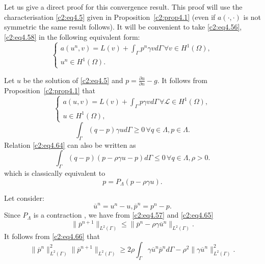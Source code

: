Let us give a direct proof for this convergence result. This proof
will use the characterisation \eqref{c2:eq4.5} given in
Proposition~\ref{c2:prop4.1}  
(even if $a(\cdot, \cdot)$ is not symmetric the same result follows). It will
be convenient to take \eqref{c2:eq4.56}, \eqref{c2:eq4.58} in the  following equivalent
form:  
\begin{equation}
\begin{cases}
a(u^n, v) = L (v) + \int_\Gamma p^n \gamma v d \Gamma\, \forall  v \in
H^1(\Omega), \\ 
u^n \in H^1(\Omega). \tag{4.62}\label{c2:eq4.62}
\end{cases}
\end{equation}

Let $u$ be the solution of \eqref{c2:eq4.5} and $p=\frac{\partial
  u}{\partial n}- g$. It follows from Proposition~\ref{c2:prop4.1} that  
\begin{equation}
\begin{cases}
a(u, v) = L (v) + \int_\Gamma  p \gamma v d \Gamma\, \forall  \mathscr{L}
\in H^1(\Omega),\\ 
u \in  H^1(\Omega), \tag{4.63}\label{c2:eq4.63}
\end{cases}
\end{equation}
\begin{equation}
\int_\Gamma (q-p) \gamma u d \Gamma \geq 0\, \forall  q \in \Lambda
, p \in \Lambda. \tag{4.64}\label{c2:eq4.64} 
\end{equation}\pageoriginale 
Relation \eqref{c2:eq4.64} can also be written as 
$$
\int_\Gamma (q-p) (p-\rho \gamma u-p) d \Gamma \leq 0\, \forall   q
\in \Lambda , \rho > 0.  
$$
which is classically equivalent to 
\begin{equation}
p = P_\Lambda  (p - \rho \gamma u). \tag{4.65}\label{c2:eq4.65}
\end{equation}

Let  consider: 
$$
\overline{u}^n = u^n -u, \overline{p}^n = p^n - p.
$$
Since $P_\Lambda $ is a contraction , we have from \eqref{c2:eq4.57}
and \eqref{c2:eq4.65}   
\begin{equation}
\parallel \overline{p}^{n + 1}\parallel_{L^2(\Gamma)} \leq \parallel \overline{p}^n - \rho
\gamma \overline{u}^n \parallel_{L^2(\Gamma)}.\tag{4.66}\label{c2:eq4.66} 
\end{equation}
It follows from \eqref{c2:eq4.66} that 
\begin{equation}
\parallel \overline{p}^n \parallel_{L^2(\Gamma)}^2
\parallel \overline{p}^{n+1}\parallel_{L^2(\Gamma)} \geq 2 \rho \int_\Gamma \gamma
\overline{u}^n \overline{p}^n d \Gamma -\rho^2 \parallel \gamma
\overline{u}^n\parallel^2_{L^2(\Gamma)}. \tag{4.67}\label{c2:eq4.67} 
\end{equation}

